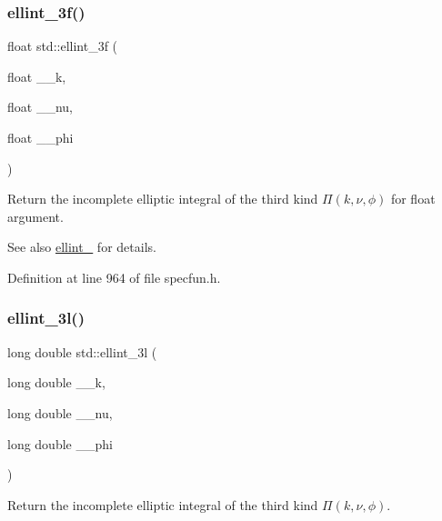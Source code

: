 \subsubsection{\texorpdfstring{ellint\+\_\+3f()}{ellint\_3f()}}
{\footnotesize\ttfamily float std\+::ellint\+\_\+3f (\begin{DoxyParamCaption}\item[{float}]{\+\_\+\+\_\+k,  }\item[{float}]{\+\_\+\+\_\+nu,  }\item[{float}]{\+\_\+\+\_\+phi }\end{DoxyParamCaption})\hspace{0.3cm}{\ttfamily [inline]}}



Return the incomplete elliptic integral of the third kind $ \Pi(k,\nu,\phi) $ for {\ttfamily float} argument. 

\begin{DoxySeeAlso}{See also}
\hyperlink{group__tr29124__math__spec__func_gaac0240d1e7e401e652b9d1adf4c7e029}{ellint\+\_} for details. 
\end{DoxySeeAlso}


Definition at line 964 of file specfun.\+h.

\mbox{\label{group__tr29124__math__spec__func_gaa8c0e5864df8769021a7f3e21a30c5d2}} 
\subsubsection{\texorpdfstring{ellint\+\_\+3l()}{ellint\_3l()}}
{\footnotesize\ttfamily long double std\+::ellint\+\_\+3l (\begin{DoxyParamCaption}\item[{long double}]{\+\_\+\+\_\+k,  }\item[{long double}]{\+\_\+\+\_\+nu,  }\item[{long double}]{\+\_\+\+\_\+phi }\end{DoxyParamCaption})\hspace{0.3cm}{\ttfamily [inline]}}



Return the incomplete elliptic integral of the third kind $ \Pi(k,\nu,\phi) $. 

